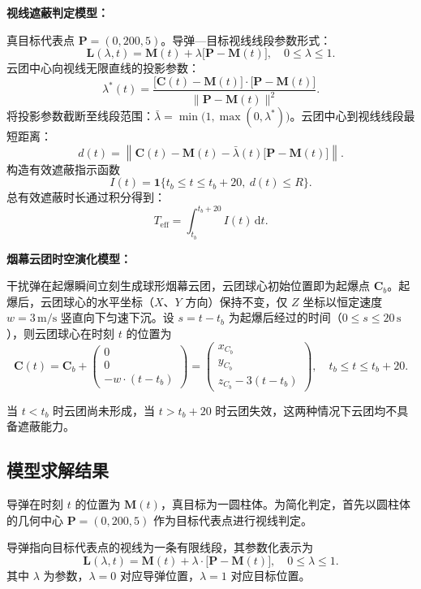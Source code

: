 \documentclass[12pt,a4paper]{article}
\begin{document}
	
	\textbf{视线遮蔽判定模型：}
	
	真目标代表点 $\boldsymbol P=(0,200,5)$。导弹—目标视线线段参数形式：
	\[
	\boldsymbol L(\lambda,t)=\boldsymbol M(t)+\lambda\big[\boldsymbol P-\boldsymbol M(t)\big],\quad 0\le \lambda \le 1.
	\]
	云团中心向视线无限直线的投影参数：
	\[
	\lambda^{*}(t)=
	\frac{\big[\boldsymbol C(t)-\boldsymbol M(t)\big]\cdot \big[\boldsymbol P-\boldsymbol M(t)\big]}
	{\|\boldsymbol P-\boldsymbol M(t)\|^2}.
	\]
	将投影参数截断至线段范围：$\bar{\lambda}=\min\big(1,\max(0,\lambda^{*})\big)$。云团中心到视线线段最短距离：
	\[
	d(t)=\left\|\boldsymbol C(t)-\boldsymbol M(t)-\bar{\lambda}(t)\big[\boldsymbol P-\boldsymbol M(t)\big]\right\|.
	\]
	构造有效遮蔽指示函数
	\[
	I(t)=
	\boldsymbol 1\big\{t_b\le t\le t_b+20,\ d(t)\le R\big\}.
	\]
	总有效遮蔽时长通过积分得到：
	\[
	T_{\mathrm{eff}}=\int_{t_b}^{t_b+20} I(t)\,\mathrm{d}t.
	\]
		
	\textbf{烟幕云团时空演化模型：}
	
	干扰弹在起爆瞬间立刻生成球形烟幕云团，云团球心初始位置即为起爆点 $\boldsymbol{C}_b$。起爆后，云团球心的水平坐标（$X$、$Y$ 方向）保持不变，仅 $Z$ 坐标以恒定速度 $w=3\,\text{m/s}$ 竖直向下匀速下沉。设 $s=t-t_b$ 为起爆后经过的时间（$0\le s\le 20\,\text{s}$），则云团球心在时刻 $t$ 的位置为
	\[
	\boldsymbol{C}(t)=\boldsymbol{C}_b+
	\begin{pmatrix}
		0\\
		0\\
		-w\cdot (t-t_b)
	\end{pmatrix}
	=
	\begin{pmatrix}
		x_{C_b}\\
		y_{C_b}\\
		z_{C_b}-3(t-t_b)
	\end{pmatrix},\quad t_b\le t\le t_b+20.
	\]
	
	当 $t<t_b$ 时云团尚未形成，当 $t>t_b+20$ 时云团失效，这两种情况下云团均不具备遮蔽能力。
	

	
	\subsection{模型求解结果}
	
	导弹在时刻 $t$ 的位置为 $\boldsymbol{M}(t)$，真目标为一圆柱体。为简化判定，首先以圆柱体的几何中心 $\boldsymbol{P}=(0,200,5)$ 作为目标代表点进行视线判定。
	
	导弹指向目标代表点的视线为一条有限线段，其参数化表示为
	\[
	\boldsymbol{L}(\lambda,t)=\boldsymbol{M}(t)+\lambda\cdot \bigl[\boldsymbol{P}-\boldsymbol{M}(t)\bigr],\quad 0\le \lambda\le 1.
	\]
	其中 $\lambda$ 为参数，$\lambda=0$ 对应导弹位置，$\lambda=1$ 对应目标位置。
	
\end{document}
